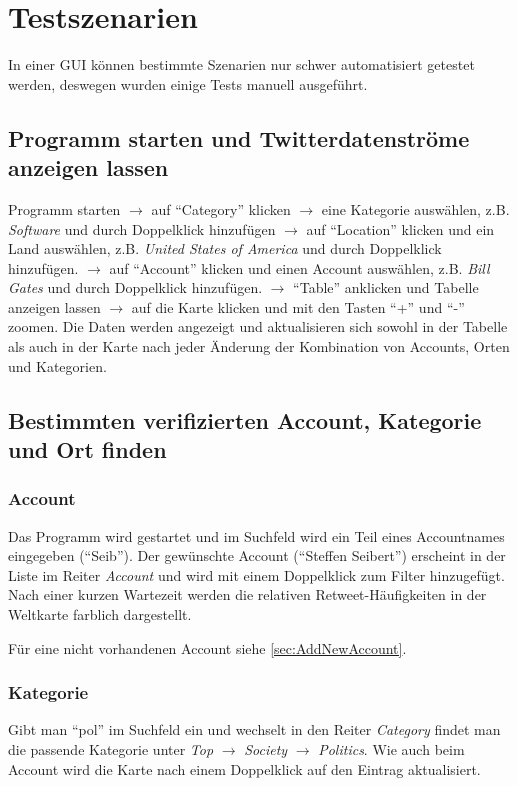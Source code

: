 \section{Testszenarien}

In einer GUI können bestimmte Szenarien nur schwer automatisiert getestet werden, deswegen wurden einige Tests manuell ausgeführt.

\subsection{Programm starten und Twitterdatenströme anzeigen lassen}
Programm starten $\to$ auf "`Category"' klicken $\to$ eine Kategorie auswählen, z.B. \textit{Software} und durch Doppelklick hinzufügen $\to$ auf "`Location"' klicken und ein Land auswählen, z.B. \textit{United States of America} und durch Doppelklick hinzufügen. $\to$ auf "`Account"' klicken und einen Account auswählen, z.B. \textit{Bill Gates} und durch Doppelklick hinzufügen. $\to$ "`Table"' anklicken und Tabelle anzeigen lassen $\to$ auf die Karte klicken und mit den Tasten "`+"' und "`-"' zoomen.
Die Daten werden angezeigt und aktualisieren sich sowohl in der Tabelle als auch in der Karte nach jeder Änderung der Kombination von Accounts, Orten und Kategorien.
\subsection{Bestimmten verifizierten Account, Kategorie und Ort finden}
\subsubsection{Account}
Das Programm wird gestartet und im Suchfeld wird ein Teil eines Accountnames eingegeben ("`Seib"'). Der gewünschte Account ("`Steffen Seibert"') erscheint in der Liste im Reiter \textit{Account} und wird mit einem Doppelklick zum Filter hinzugefügt. Nach einer kurzen Wartezeit werden die relativen Retweet-Häufigkeiten in der Weltkarte farblich dargestellt.

Für eine nicht vorhandenen Account siehe \cref{sec:AddNewAccount}.
\subsubsection{Kategorie}
Gibt man "`pol"' im Suchfeld ein und wechselt in den Reiter \textit{Category} findet man die passende Kategorie unter \textit{Top} $\to$ \textit{Society} $\to$ \textit{Politics}. Wie auch beim Account wird die Karte nach einem Doppelklick auf den Eintrag aktualisiert.
